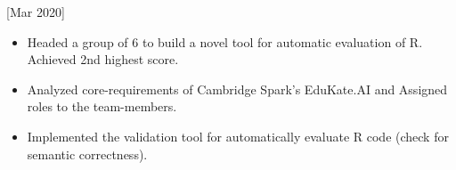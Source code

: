 \documentclass[11pt]{article}
\begin{document}
[Mar 2020]
\begin{itemize}
    \item Headed a group of 6 to build a novel tool for automatic evaluation of R. Achieved 2nd highest score.
    \item Analyzed core-requirements of Cambridge Spark's EduKate.AI and Assigned roles to the team-members.
    \item Implemented the validation tool for automatically evaluate R code (check for semantic correctness).
\end{itemize}


\end{document}
